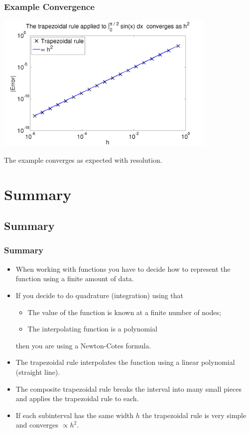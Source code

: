 \documentclass{beamer}
\begin{document}
\begin{frame}
  \frametitle{Example Convergence}

  \begin{center}
    \includegraphics[width=0.8\textwidth]{figures/Trapezoidal1}
  \end{center}
  The example converges as expected with resolution.

\end{frame}

\section{Summary}

\subsection{Summary}

\begin{frame}
  \frametitle{Summary}

  \begin{itemize}
  \item When working with functions you have to decide how to
    represent the function using a finite amount of data.
  \item If you decide to do quadrature (integration) using that
    \begin{itemize}
    \item The value of the function is known at a finite number of nodes;
    \item The interpolating function is a polynomial
    \end{itemize}
    then you are using a Newton-Cotes formula.
  \item The trapezoidal rule interpolates the function using a linear
    polynomial (straight line).
  \item The composite trapezoidal rule breaks the interval into many
    small pieces and applies the trapezoidal rule to each.
  \item If each subinterval has the same width $h$ the trapezoidal
    rule is very simple and converges $\propto h^{2}$.
  \end{itemize}

\end{frame}
\end{document}
